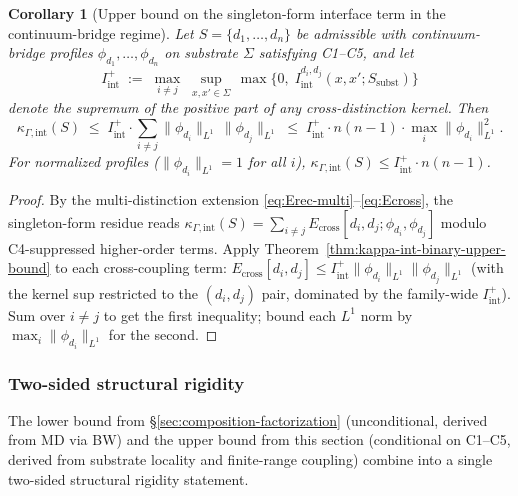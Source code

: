 \documentclass[11pt]{article}
\newtheorem{corollary}[theorem]{Corollary}
\begin{document}
\begin{corollary}[Upper bound on the singleton-form interface term in the continuum-bridge regime]\label{cor:kappa-int-singleton-upper-bound}
Let $S = \{d_1, \ldots, d_n\}$ be admissible with continuum-bridge profiles $\phi_{d_1}, \ldots, \phi_{d_n}$ on substrate $\Sigma$ satisfying C1--C5, and let
\[
    I_{\mathrm{int}}^+ \;:=\; \max_{i \neq j}\;\sup_{x, x'\in\Sigma}\, \max\bigl\{0,\; I_{\mathrm{int}}^{d_i, d_j}(x, x'; S_{\mathrm{subst}})\bigr\}
\]
denote the supremum of the positive part of any cross-distinction kernel.  Then
\[
    \kappa_{\Gamma,\mathrm{int}}(S)
    \;\le\;
    I_{\mathrm{int}}^+ \cdot \!\!\sum_{i \neq j} \!\!\|\phi_{d_i}\|_{L^1}\,\|\phi_{d_j}\|_{L^1}
    \;\le\;
    I_{\mathrm{int}}^+ \cdot n(n-1) \cdot \max_i \|\phi_{d_i}\|_{L^1}^2.
\]
For normalized profiles ($\|\phi_{d_i}\|_{L^1} = 1$ for all $i$), $\kappa_{\Gamma,\mathrm{int}}(S) \le I_{\mathrm{int}}^+ \cdot n(n-1)$.
\end{corollary}
\begin{proof}
By the multi-distinction extension \eqref{eq:Erec-multi}--\eqref{eq:Ecross}, the singleton-form residue reads $\kappa_{\Gamma,\mathrm{int}}(S) = \sum_{i\neq j} E_{\mathrm{cross}}[d_i, d_j; \phi_{d_i}, \phi_{d_j}]$ modulo C4-suppressed higher-order terms.  Apply Theorem~\ref{thm:kappa-int-binary-upper-bound} to each cross-coupling term: $E_{\mathrm{cross}}[d_i, d_j] \le I_{\mathrm{int}}^+ \|\phi_{d_i}\|_{L^1} \|\phi_{d_j}\|_{L^1}$ (with the kernel sup restricted to the $(d_i, d_j)$ pair, dominated by the family-wide $I_{\mathrm{int}}^+$).  Sum over $i \neq j$ to get the first inequality; bound each $L^1$ norm by $\max_i\|\phi_{d_i}\|_{L^1}$ for the second.
\end{proof}

\subsubsection*{Two-sided structural rigidity}

The lower bound from \S\ref{sec:composition-factorization} (unconditional, derived from MD via BW) and the upper bound from this section (conditional on C1--C5, derived from substrate locality and finite-range coupling) combine into a single two-sided structural rigidity statement.
\end{document}
